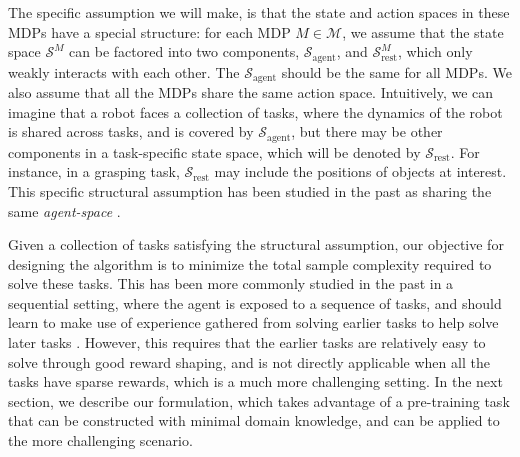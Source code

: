 \documentclass{article} %
\newcommand{\sset}{\mathcal{S}}
\newcommand{\mdpset}{\mathcal{M}}
\newcommand{\agent}{\mathrm{agent}}
\begin{document}
The specific assumption we will make, is that the state and action spaces in these MDPs have a special structure: for each MDP $M \in \mdpset$, we assume that the state space $\sset^M$ can be factored into two components, $\sset_\agent$, and $\sset_{\mathrm{rest}}^M$, which only weakly interacts with each other.
The $\sset_\agent$ should be the same for all MDPs. We also assume that all the MDPs share the same action space.
Intuitively, we can imagine that a robot faces a collection of tasks, where the dynamics of the robot is shared across tasks, and is covered by $\sset_\agent$, but there may be other components in a task-specific state space, which will be denoted by $\sset_{\mathrm{rest}}$. For instance, in a grasping task, $\sset_{\mathrm{rest}}$ may include the positions of objects at interest. This specific structural assumption has been studied in the past as sharing the same \emph{agent-space} \citep{konidaris2007building}.

Given a collection of tasks satisfying the structural assumption, our objective for designing the algorithm is to minimize the total sample complexity required to solve these tasks. This has been more commonly studied in the past in a sequential setting, where the agent is exposed to a sequence of tasks, and should learn to make use of experience gathered from solving earlier tasks to help solve later tasks \citep{taylor2009transfer, wilson2007multi, lazaric2010bayesian, devin2016learning}. However, this requires that the earlier tasks 
are relatively easy to solve through good reward shaping, and is not directly applicable when all the tasks have sparse rewards, which is a much more challenging setting. In the next section, we describe our formulation, which takes advantage of a pre-training task that can be constructed with minimal domain knowledge, and can be applied to the more challenging scenario.%


\end{document}
